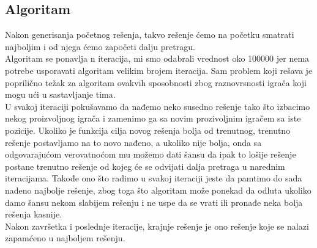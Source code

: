 \documentclass[a4paper]{article}
\begin{document}
\subsection{Algoritam}
Nakon generisanja početnog rešenja, takvo rešenje ćemo na početku smatrati najboljim i od njega ćemo započeti dalju pretragu. \\
Algoritam se ponavlja n iteracija, mi smo odabrali vrednost oko 100000 jer nema potrebe usporavati algoritam velikim brojem iteracija. Sam problem koji rešava je poprilično težak za algoritam ovakvih sposobnosti zbog raznovrsnosti igrača koji mogu ući u sastavljanje tima. \\
U svakoj iteraciji pokušavamo da nađemo neko susedno rešenje tako što izbacimo nekog proizvoljnog igrača i zamenimo ga sa novim prozivoljnim igračem sa iste pozicije. Ukoliko je funkcija cilja novog rešenja bolja od trenutnog, trenutno rešenje postavljamo na to novo nađeno, a ukoliko nije bolja, onda sa odgovarajućom verovatnoćom mu možemo dati šansu da ipak to lošije rešenje postane trenutno rešenje od kojeg će se odvijati dalja pretraga u narednim iteracijama. Takođe ono što radimo u svakoj iteraciji jeste da pamtimo do sada nađeno najbolje rešenje, zbog toga što algoritam može ponekad da odluta ukoliko damo šansu nekom slabijem rešenju i ne uspe da se vrati ili pronađe neka bolja rešenja kasnije. \\
Nakon završetka i poslednje iteracije, krajnje rešenje je ono rešenje koje se nalazi zapamćeno u najboljem rešenju.






\end{document}
